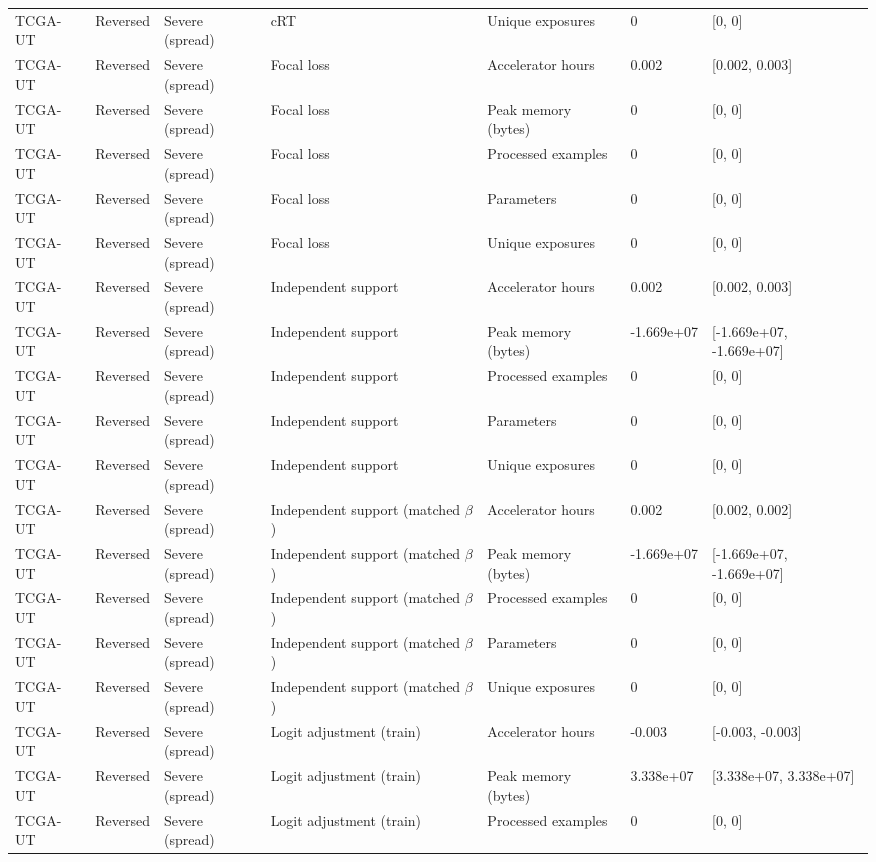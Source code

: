 \begin{longtable}{lllllll}
TCGA-UT & Reversed & Severe (spread) & cRT & Unique exposures & 0 & [0, 0] \\
TCGA-UT & Reversed & Severe (spread) & Focal loss & Accelerator hours & 0.002 & [0.002, 0.003] \\
TCGA-UT & Reversed & Severe (spread) & Focal loss & Peak memory (bytes) & 0 & [0, 0] \\
TCGA-UT & Reversed & Severe (spread) & Focal loss & Processed examples & 0 & [0, 0] \\
TCGA-UT & Reversed & Severe (spread) & Focal loss & Parameters & 0 & [0, 0] \\
TCGA-UT & Reversed & Severe (spread) & Focal loss & Unique exposures & 0 & [0, 0] \\
TCGA-UT & Reversed & Severe (spread) & Independent support & Accelerator hours & 0.002 & [0.002, 0.003] \\
TCGA-UT & Reversed & Severe (spread) & Independent support & Peak memory (bytes) & -1.669e+07 & [-1.669e+07, -1.669e+07] \\
TCGA-UT & Reversed & Severe (spread) & Independent support & Processed examples & 0 & [0, 0] \\
TCGA-UT & Reversed & Severe (spread) & Independent support & Parameters & 0 & [0, 0] \\
TCGA-UT & Reversed & Severe (spread) & Independent support & Unique exposures & 0 & [0, 0] \\
TCGA-UT & Reversed & Severe (spread) & Independent support (matched $\beta$) & Accelerator hours & 0.002 & [0.002, 0.002] \\
TCGA-UT & Reversed & Severe (spread) & Independent support (matched $\beta$) & Peak memory (bytes) & -1.669e+07 & [-1.669e+07, -1.669e+07] \\
TCGA-UT & Reversed & Severe (spread) & Independent support (matched $\beta$) & Processed examples & 0 & [0, 0] \\
TCGA-UT & Reversed & Severe (spread) & Independent support (matched $\beta$) & Parameters & 0 & [0, 0] \\
TCGA-UT & Reversed & Severe (spread) & Independent support (matched $\beta$) & Unique exposures & 0 & [0, 0] \\
TCGA-UT & Reversed & Severe (spread) & Logit adjustment (train) & Accelerator hours & -0.003 & [-0.003, -0.003] \\
TCGA-UT & Reversed & Severe (spread) & Logit adjustment (train) & Peak memory (bytes) & 3.338e+07 & [3.338e+07, 3.338e+07] \\
TCGA-UT & Reversed & Severe (spread) & Logit adjustment (train) & Processed examples & 0 & [0, 0] \\

\end{longtable}
